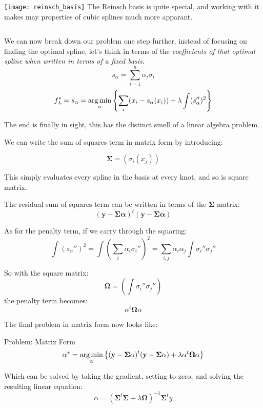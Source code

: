 %
%
\begin{frame}
  \begin{columns}
      \texttt{[image: reinsch\_basis]}
      The Reinsch basis is quite special, and working with it makes may properties of cubic splines much more apparant.
  \end{columns}
  
\end{frame}

\begin{frame}
  We can now break down our problem one step further, instead of focusing on finding the optimal spline, let's think in terms of the \textit{coefficients of that optimal spline when written in terms of a fixed basis}.
    $$ s_{\alpha} = \sum_{i=1}^{n} \alpha_i \sigma_i $$
    $$ f_{\lambda}^* = s_{\alpha} = \operatorname*{arg\,min}_{\alpha} \left\{ \sum_i (x_i - s_{\alpha}(x_i)) + \lambda \int (s_{\alpha}'')^2 \right\} $$
\end{frame}
%
%
\begin{frame}
  The end is finally in sight, this has the distinct smell of a linear algebra problem. 
\end{frame}
%
%
\begin{frame}
  We can write the sum of squares term in matrix form by introducing:
  
  $$ \mathbf{\Sigma} = \left( \sigma_i (x_j) \right) $$
  
  This simply evaluates every spline in the basis at every knot, and so is square matrix.
\end{frame}
%
%
\begin{frame}
  The residual sum of squares term can be written in terms of the $\mathbf{\Sigma}$ matrix:
  $$ (\mathbf{y} - \mathbf{\Sigma} \mathbf{\alpha})^{t}(\mathbf{y} - \mathbf{\Sigma} \mathbf{\alpha})$$
\end{frame}
%
%
\begin{frame}
  As for the penalty term, if we carry through the squaring:
  $$ \int (s_{\alpha}'')^2 = \int \left( \sum_i \alpha_i \sigma_i'' \right)^2 = \sum_{i,j} \alpha_i \alpha_j \int \sigma_i'' \sigma_j'' $$
\end{frame}
%
%
\begin{frame}
  So with the square matrix:
  $$ \mathbf{\Omega} = \left( \int \sigma_i'' \sigma_j'' \right) $$
  the penalty term becomes:
  $$ \alpha^t \mathbf{\Omega} \alpha $$
\end{frame}
%
%
\begin{frame}
  The final problem in matrix form now looks like:
  \begin{block}{Problem: Matrix Form}
    $$\alpha^* = \operatorname*{arg\,min}_{\alpha} \left\{ (\mathbf{y} - \mathbf{\Sigma} \mathbf{\alpha})^{t}(\mathbf{y} - \mathbf{\Sigma} \mathbf{\alpha}) + \lambda \alpha^t \mathbf{\Omega} \alpha \right\} $$ 
  \end{block}
  Which can be solved by taking the gradient, setting to zero, and solving the resulting linear equation:
  $$ \alpha = ( \mathbf{\Sigma}^t \mathbf{\Sigma} + \lambda \mathbf{\Omega} )^{-1} \mathbf{\Sigma}^t y $$
\end{frame}
